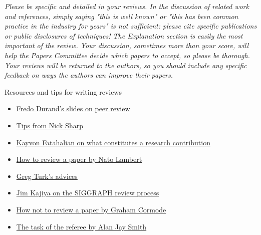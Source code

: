 \textit{Please be specific and detailed in your reviews. In the discussion of related work and references, simply saying "this is well known" or "this has been common practice in the industry for years" is not sufficient: please cite specific publications or public disclosures of techniques! The Explanation section is easily the most important of the review. Your discussion, sometimes more than your score, will help the Papers Committee decide which papers to accept, so please be thorough. Your reviews will be returned to the authors, so you should include any specific feedback on ways the authors can improve their papers.}

Resources and tips for writing reviews
\begin{itemize}
	\item \href{http://people.csail.mit.edu/fredo/review.pdf}{Fredo Durand's slides on peer review}
	\item \href{https://twitter.com/nmwsharp/status/1491528553766305801}{Tips from Nick Sharp}
	\item \href{https://graphics.stanford.edu/~kayvonf/notes/systemspaper/}{Kayvon Fatahalian on what constitutes a research contribution}
	\item \href{https://www.natolambert.com/guides/how-to-review-a-paper}{How to review a paper by Nato Lambert}
	\item \href{https://web.archive.org/web/20180124233323/http:/www.siggraph.org/s2008/submissions/juried/papers/review_writing.php}{Greg Turk's advices}
	\item \href{https://www.siggraph.org/sites/default/files/kajiya.pdf}{Jim Kajiya on the SIGGRAPH review process}
	\item \href{https://sigmodrecord.org/publications/sigmodRecord/0812/p100.open.cormode.pdf}{How not to review a paper by Graham Cormode}
	\item \href{https://www.cs.princeton.edu/~jrex/teaching/spring2005/fft/reviewing.html}{The task of the referee by Alan Jay Smith}
\end{itemize}

